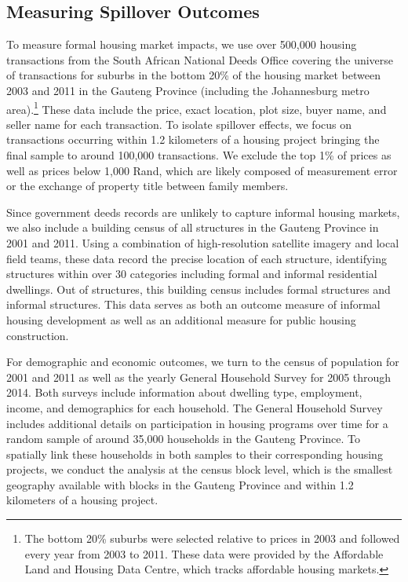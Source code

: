 \documentclass[12pt]{article}
\begin{document}
\subsection{Measuring Spillover Outcomes}

To measure formal housing market impacts, we use over 500,000 housing transactions from the South African National Deeds Office covering the universe of transactions for suburbs in the bottom 20\% of the housing market between 2003 and 2011 in the Gauteng Province (including the Johannesburg metro area).\footnote{The bottom 20\% suburbs were selected relative to prices in 2003 and followed every year from 2003 to 2011.  These data were provided by the Affordable Land and Housing Data Centre, which tracks affordable housing markets.}  These data include the price, exact location, plot size, buyer name, and seller name for each transaction.  To isolate spillover effects, we focus on transactions occurring within 1.2 kilometers of a housing project bringing the final sample to around 100,000 transactions.  We exclude the top 1\% of prices as well as prices below 1,000 Rand, which are likely composed of measurement error or the exchange of property title between family members.

Since government deeds records are unlikely to capture informal housing markets, we also include a building census of all structures in the Gauteng Province in 2001 and 2011.  Using a combination of high-resolution satellite imagery and local field teams, these data record the precise location of each structure, identifying structures within over 30 categories including formal and informal residential dwellings.  Out of structures, this building census includes formal structures and informal structures.  This data serves as both an outcome measure of informal housing development as well as an additional measure for public housing construction.

For demographic and economic outcomes, we turn to the census of population for 2001 and 2011 as well as the yearly General Household Survey for 2005 through 2014.  Both surveys include information about dwelling type, employment, income, and demographics for each household.  The General Household Survey includes additional details on participation in housing programs over time for a random sample of around 35,000 households in the Gauteng Province.  To spatially link these households in both samples to their corresponding housing projects, we conduct the analysis at the census block level, which is the smallest geography available with blocks in the Gauteng Province and within 1.2 kilometers of a housing project.  
\end{document}
